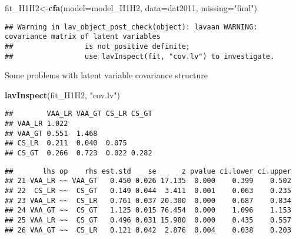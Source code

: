 \documentclass[
]{article}
\newenvironment{Shaded}{\begin{snugshade}}{\end{snugshade}}
\newcommand{\CommentTok}[1]{\textcolor[rgb]{0.56,0.35,0.01}{\textit{#1}}}
\newcommand{\DataTypeTok}[1]{\textcolor[rgb]{0.13,0.29,0.53}{#1}}
\newcommand{\KeywordTok}[1]{\textcolor[rgb]{0.13,0.29,0.53}{\textbf{#1}}}
\newcommand{\NormalTok}[1]{#1}
\newcommand{\OperatorTok}[1]{\textcolor[rgb]{0.81,0.36,0.00}{\textbf{#1}}}
\newcommand{\StringTok}[1]{\textcolor[rgb]{0.31,0.60,0.02}{#1}}
\begin{document}
\begin{Shaded}
\begin{Highlighting}[]
\NormalTok{fit_H1H2<-}\KeywordTok{cfa}\NormalTok{(}\DataTypeTok{model=}\NormalTok{model_H1H2,}
              \DataTypeTok{data=}\NormalTok{dat2011,}
              \DataTypeTok{missing=}\StringTok{"fiml"}\NormalTok{)}
\end{Highlighting}
\end{Shaded}

\begin{verbatim}
## Warning in lav_object_post_check(object): lavaan WARNING: covariance matrix of latent variables
##                 is not positive definite;
##                 use lavInspect(fit, "cov.lv") to investigate.
\end{verbatim}

Some problems with latent variable covariance structure

\begin{Shaded}
\begin{Highlighting}[]
\KeywordTok{lavInspect}\NormalTok{(fit_H1H2, }\StringTok{"cov.lv"}\NormalTok{)}
\end{Highlighting}
\end{Shaded}

\begin{verbatim}
##        VAA_LR VAA_GT CS_LR CS_GT
## VAA_LR 1.022                    
## VAA_GT 0.551  1.468             
## CS_LR  0.211  0.040  0.075      
## CS_GT  0.266  0.723  0.022 0.282
\end{verbatim}

\begin{Shaded}
\end{Shaded}

\begin{verbatim}
##       lhs op    rhs est.std    se      z pvalue ci.lower ci.upper
## 21 VAA_LR ~~ VAA_GT   0.450 0.026 17.135  0.000    0.399    0.502
## 22  CS_LR ~~  CS_GT   0.149 0.044  3.411  0.001    0.063    0.235
## 23 VAA_LR ~~  CS_LR   0.761 0.037 20.300  0.000    0.687    0.834
## 24 VAA_GT ~~  CS_GT   1.125 0.015 76.454  0.000    1.096    1.153
## 25 VAA_LR ~~  CS_GT   0.496 0.031 15.980  0.000    0.435    0.557
## 26 VAA_GT ~~  CS_LR   0.121 0.042  2.876  0.004    0.038    0.203
\end{verbatim}
\end{document}
